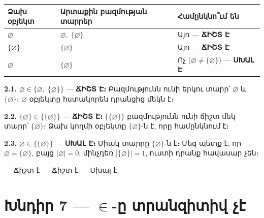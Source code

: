 \documentclass[12pt, a4paper]{article}
\begin{document}
\begin{center}
\renewcommand{\arraystretch}{1.4}
\begin{tabular}{lll}
\toprule
\textbf{Ձախ օբյեկտ} & \textbf{Արտաքին բազմության տարրեր} & \textbf{Համընկնո՞ւմ են} \\
\midrule
$\varnothing$ & $\varnothing,\;\{\varnothing\}$ & Այո — \textbf{ՃԻՇՏ Է} \\
$\{\varnothing\}$ & $\{\varnothing\}$ & Այո — \textbf{ՃԻՇՏ Է} \\
$\varnothing$ & $\{\varnothing\}$ & Ոչ ($\varnothing \neq \{\varnothing\}$) — \textbf{ՍԽԱԼ Է} \\
\bottomrule
\end{tabular}
\end{center}

\textbf{2.1.}\; $\varnothing \in \{\varnothing,\;\{\varnothing\}\}$
\;---\; \textbf{ՃԻՇՏ Է։}
Բազմությունն ունի երկու տարր՝ $\varnothing$ և $\{\varnothing\}$։
$\varnothing$ օբյեկտը հստակորեն դրանցից մեկն է։

\textbf{2.2.}\; $\{\varnothing\} \in \{\{\varnothing\}\}$
\;---\; \textbf{ՃԻՇՏ Է։}
$\{\{\varnothing\}\}$ բազմությունն ունի ճիշտ մեկ տարր՝ $\{\varnothing\}$։
Ձախ կողմի օբյեկտը $\{\varnothing\}$-ն է, որը համընկնում է։

\textbf{2.3.}\; $\varnothing \in \{\{\varnothing\}\}$
\;---\; \textbf{ՍԽԱԼ Է։}
Միակ տարրը $\{\varnothing\}$-ն է։
Մեզ պետք է, որ $\varnothing = \{\varnothing\}$, բայց $|\varnothing|=0$, մինչդեռ $|\{\varnothing\}|=1$,
ուստի դրանք հավասար չեն։

\begin{answerbox}
 — Ճիշտ է  — Ճիշտ է  — Սխալ է
\end{answerbox}

\section{Խնդիր 7 — $\in$-ը տրանզիտիվ չէ}
\end{document}
